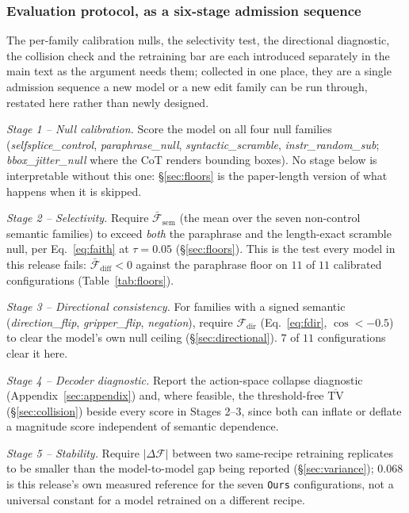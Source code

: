 \subsubsection{Evaluation protocol, as a six-stage admission sequence}
\label{sec:eval_protocol}
The per-family calibration nulls, the selectivity test, the directional diagnostic, the collision check and the retraining bar are each introduced separately in the main text as the argument needs them; collected in one place, they are a single admission sequence a new model or a new edit family can be run through, restated here rather than newly designed.

\emph{Stage 1 -- Null calibration.} Score the model on all four null families (\emph{selfsplice\_control}, \emph{paraphrase\_null}, \emph{syntactic\_scramble}, \emph{instr\_random\_sub}; \emph{bbox\_jitter\_null} where the CoT renders bounding boxes). No stage below is interpretable without this one: \S\ref{sec:floors} is the paper-length version of what happens when it is skipped.

\emph{Stage 2 -- Selectivity.} Require $\bar{\mathcal{F}}_{\text{sem}}$ (the mean over the seven non-control semantic families) to exceed \emph{both} the paraphrase and the length-exact scramble null, per Eq.~\ref{eq:faith} at $\tau{=}0.05$ (\S\ref{sec:floors}). This is the test every model in this release fails: $\bar{\mathcal{F}}_{\text{diff}} < 0$ against the paraphrase floor on $11$ of $11$ calibrated configurations (Table~\ref{tab:floors}).

\emph{Stage 3 -- Directional consistency.} For families with a signed semantic (\emph{direction\_flip}, \emph{gripper\_flip}, \emph{negation}), require $\mathcal{F}_{\text{dir}}$ (Eq.~\ref{eq:fdir}, $\cos < -0.5$) to clear the model's own null ceiling (\S\ref{sec:directional}). $7$ of $11$ configurations clear it here.

\emph{Stage 4 -- Decoder diagnostic.} Report the action-space collapse diagnostic (Appendix~\ref{sec:appendix}) and, where feasible, the threshold-free $\overline{\text{TV}}$ (\S\ref{sec:collision}) beside every score in Stages 2--3, since both can inflate or deflate a magnitude score independent of semantic dependence.

\emph{Stage 5 -- Stability.} Require $|\Delta \mathcal{F}|$ between two same-recipe retraining replicates to be smaller than the model-to-model gap being reported (\S\ref{sec:variance}); $0.068$ is this release's own measured reference for the seven \texttt{Ours} configurations, not a universal constant for a model retrained on a different recipe.


